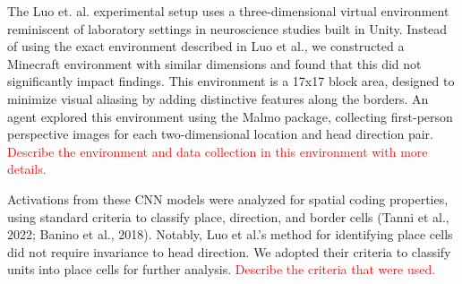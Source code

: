 \documentclass[11pt]{article}
\begin{document}
The Luo et. al. experimental setup uses a three-dimensional virtual environment reminiscent of laboratory settings in neuroscience studies built in Unity. Instead of using the exact environment described in Luo et al., we constructed a Minecraft environment with similar dimensions and found that this did not significantly impact findings. This environment is a 17x17 block area, designed to minimize visual aliasing by adding distinctive features along the borders. An agent explored this environment using the Malmo package, collecting first-person perspective images for each two-dimensional location and head direction pair. \textcolor{red}{Describe the environment and data collection in this environment with more details.}

Activations from these CNN models were analyzed for spatial coding properties, using standard criteria to classify place, direction, and border cells (Tanni et al., 2022; Banino et al., 2018). Notably, Luo et al.’s method for identifying place cells did not require invariance to head direction. We adopted their criteria to classify units into place cells for further analysis.
\textcolor{red}{Describe the criteria that were used.}
\end{document}
